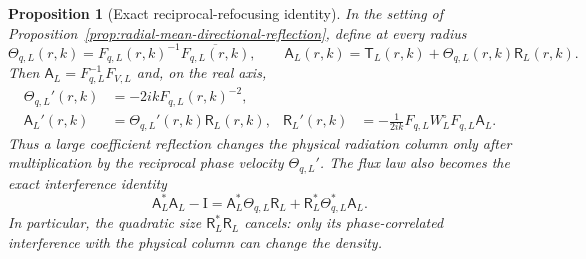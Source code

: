 \documentclass[11pt]{article}
\newcommand{\Id}{\mathrm I}
\newtheorem{proposition}[theorem]{Proposition}
\theoremstyle{definition}
\theoremstyle{remark}
\begin{document}
\begin{proposition}[Exact reciprocal-refocusing identity]
\label{prop:exact-reciprocal-refocusing}
In the setting of Proposition~\ref{prop:radial-mean-directional-reflection},
define at every radius
\begin{equation}
 \Theta_{q,L}(r,k)=F_{q,L}(r,k)^{-1}
                    \overline{F_{q,L}(r,k)},
 \qquad
 \mathsf A_L(r,k)=\mathsf T_L(r,k)
                   +\Theta_{q,L}(r,k)\mathsf R_L(r,k).
 \label{eq:radial-refocusing-A}
\end{equation}
Then $\mathsf A_L=F_{q,L}^{-1}F_{V,L}$ and, on the real axis,
\begin{align}
 \Theta_{q,L}'(r,k)&=-2ikF_{q,L}(r,k)^{-2},
 \label{eq:radial-reference-phase-velocity}\\
 \mathsf A_L'(r,k)&=\Theta_{q,L}'(r,k)\mathsf R_L(r,k),
 &
 \mathsf R_L'(r,k)&=-\frac1{2ik}F_{q,L}W_L^\circ F_{q,L}
                         \mathsf A_L.
 \label{eq:closed-refocusing-system}
\end{align}
Thus a large coefficient reflection changes the physical radiation column only
after multiplication by the reciprocal phase velocity $\Theta_{q,L}'$.
The flux law also becomes the exact interference identity
\begin{equation}
 \mathsf A_L^*\mathsf A_L-\Id
 =\mathsf A_L^*\Theta_{q,L}\mathsf R_L
  +\mathsf R_L^*\Theta_{q,L}^*\mathsf A_L.
 \label{eq:exact-reflection-interference}
\end{equation}
In particular, the quadratic size $\mathsf R_L^*\mathsf R_L$ cancels: only its
phase-correlated interference with the physical column can change the density.


\end{proposition}
\end{document}
